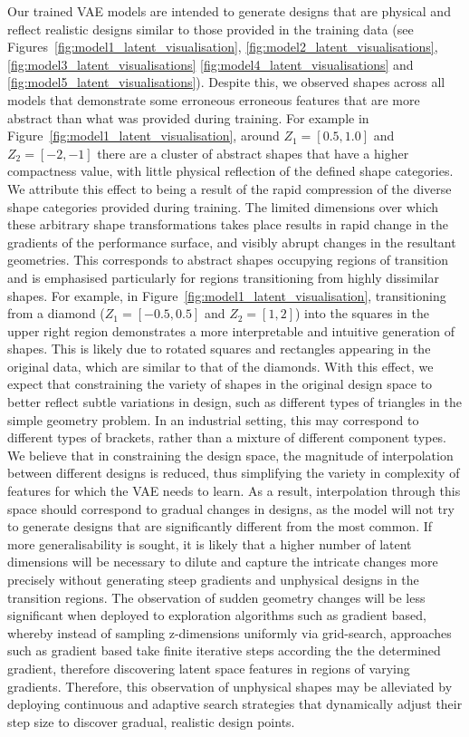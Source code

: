 \documentclass{article}
\begin{document}
Our trained VAE models are intended to generate designs that are physical and reflect realistic designs similar to those provided in the training data (see Figures~\ref{fig:model1_latent_visualisation}, \ref{fig:model2_latent_visualisations}, \ref{fig:model3_latent_visualisations} \ref{fig:model4_latent_visualisations} and \ref{fig:model5_latent_visualisations}). Despite this, we observed shapes across all models that demonstrate some erroneous erroneous features that are more abstract than what was provided during training. For example in Figure~\ref{fig:model1_latent_visualisation}, around $Z_1=[0.5,1.0]$ and $Z_2=[-2,-1]$ there are a cluster of abstract shapes that have a higher compactness value, with little physical reflection of the defined shape categories. We attribute this effect to being a result of the rapid compression of the diverse shape categories provided during training. The limited dimensions over which these arbitrary shape transformations takes place results in rapid change in the gradients of the performance surface, and visibly abrupt changes in the resultant geometries. This corresponds to abstract shapes occupying regions of transition and is emphasised particularly for regions transitioning from highly dissimilar shapes. For example, in Figure~\ref{fig:model1_latent_visualisation}, transitioning from a diamond ($Z_1=[-0.5,0.5]$ and $Z_2=[1,2]$) into the squares in the upper right region demonstrates a more interpretable and intuitive generation of shapes. This is likely due to rotated squares and rectangles appearing in the original data, which are similar to that of the diamonds. With this effect, we expect that constraining the variety of shapes in the original design space to better reflect subtle variations in design, such as different types of triangles in the simple geometry problem. In an industrial setting, this may correspond to different types of brackets, rather than a mixture of different component types. We believe that in constraining the design space, the magnitude of interpolation between different designs is reduced, thus simplifying the variety in complexity of features for which the VAE needs to learn. As a result, interpolation through this space should correspond to gradual changes in designs, as the model will not try to generate designs that are significantly different from the most common. If more generalisability is sought, it is likely that a higher number of latent dimensions will be necessary to dilute and capture the intricate changes more precisely without generating steep gradients and unphysical designs in the transition regions. The observation of sudden geometry changes will be less significant when deployed to exploration algorithms such as gradient based, whereby instead of sampling z-dimensions uniformly via grid-search, approaches such as gradient based take finite iterative steps according the the determined gradient, therefore discovering latent space features in regions of varying gradients. Therefore, this observation of unphysical shapes may be alleviated by deploying continuous and adaptive search strategies that dynamically adjust their step size to discover gradual, realistic design points.
\end{document}
